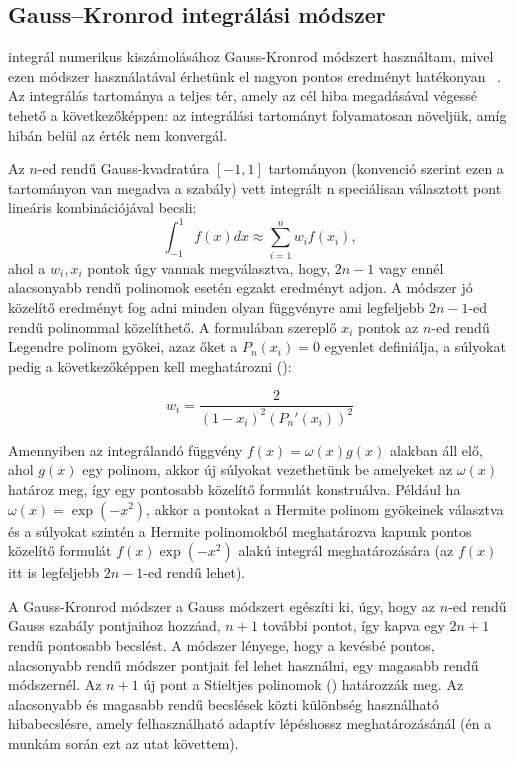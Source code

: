 \documentclass[11pt,a4paper]{article}
\numberwithin{equation}{subsection}
\numberwithin{figure}{section}
\begin{document}
\subsection{Gauss–Kronrod integrálási módszer}\label{sec:GK}

 integrál numerikus kiszámolásához Gauss-Kronrod módszert használtam, mivel ezen módszer használatával érhetünk el nagyon pontos eredményt hatékonyan  ~\cite{LevyEff}. Az integrálás tartománya a teljes tér, amely az cél hiba megadásával végessé tehető a következőképpen: az integrálási tartományt folyamatosan növeljük, amíg hibán belül az érték nem konvergál. 

Az $n$-ed rendű Gauss-kvadratúra $[-1,1]$ tartományon (konvenció szerint ezen a tartományon van megadva a szabály) vett integrált n speciálisan választott pont lineáris kombinációjával becsli:
\begin{equation}
\int_{-1}^1 f(x)dx\approx \sum_{i=1}^n w_if(x_i),
\end{equation}
ahol a $w_i, x_i$ pontok úgy vannak megválasztva, hogy, $2n-1$ vagy ennél alacsonyabb rendű polinomok esetén egzakt eredményt adjon. A módszer jó közelítő eredményt fog adni minden olyan függvényre ami legfeljebb $2n-1$-ed rendű polinommal közelíthető. A formulában szereplő $x_i$ pontok az $n$-ed rendű Legendre polinom gyökei, azaz őket a $P_n(x_i)=0$ egyenlet definiálja, a súlyokat pedig a következőképpen kell meghatározni (\cite{LGQ}):

\begin{equation}
w_i=\frac{2}{(1-x_i)^2(P_n'(x_i))^2}
\end{equation}

Amennyiben az integrálandó függvény $f(x)=\omega(x)g(x)$ alakban áll elő, ahol $g(x)$ egy polinom, akkor új súlyokat vezethetünk be amelyeket az $\omega(x)$ határoz meg, így egy pontosabb közelítő formulát konstruálva. Például ha $\omega(x)=\exp(-x^2)$, akkor a pontokat a Hermite polinom gyökeinek választva és a súlyokat szintén a Hermite polinomokból meghatározva kapunk pontos közelítő formulát $f(x)\exp(-x^2)$ alakú integrál meghatározására (az $f(x)$ itt is legfeljebb $2n-1$-ed rendű lehet).

A Gauss-Kronrod módszer a Gauss módszert egészíti ki, úgy, hogy az $n$-ed rendű Gauss szabály pontjaihoz hozzáad, $n+1$ további pontot, így kapva egy $2n+1$ rendű pontosabb becslést. A módszer lényege, hogy a kevésbé pontos, alacsonyabb rendű módszer pontjait fel lehet használni, egy magasabb rendű módszernél. Az $n+1$ új pont a Stieltjes polinomok (\cite{NIST:DLMF}) határozzák meg. Az alacsonyabb és magasabb rendű becslések közti különbség használható hibabecslésre, amely felhasználható adaptív lépéshossz meghatározásánál (én a munkám során ezt az utat követtem). 
\end{document}
